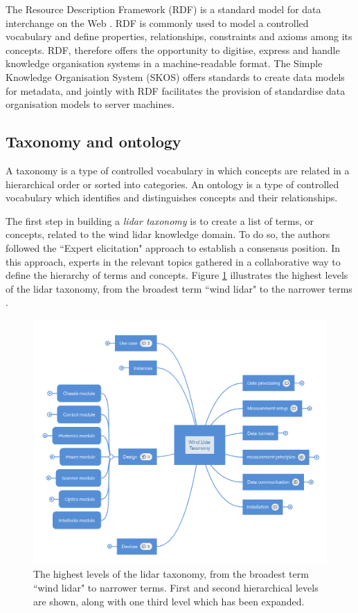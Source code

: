 \documentclass[remotesensing,article,submit,pdftex,moreauthors]{Definitions/mdpi}
\begin{document}
The Resource Description Framework (RDF) is a standard model for data interchange on the Web \cite{ref-W3C-RDF}.
RDF is commonly used to model a controlled vocabulary and define properties, relationships, constraints and axioms among its concepts.
RDF, therefore offers the opportunity to digitise, express and handle knowledge organisation systems in a machine-readable format.
The Simple Knowledge Organisation System (SKOS) \cite{ref-W3C-SKOS} offers standards to create data models for metadata, and jointly with RDF facilitates the provision of standardise data organisation models to server machines.

\subsection{Taxonomy and ontology}
A taxonomy is a type of controlled vocabulary in which concepts are related in a hierarchical order or sorted into categories.
An ontology is a type of controlled vocabulary
which identifies and distinguishes concepts and their relationships.

The first step in building a {\it lidar taxonomy} is to create a list of terms, or concepts, related to the wind lidar knowledge domain. To do so, the authors followed the ``Expert elicitation" approach to establish a consensus position. In this approach, experts in the relevant topics gathered in a collaborative way to define the hierarchy of terms and concepts. Figure \ref{fig:tax} illustrates the highest levels of the lidar taxonomy, from the broadest term ``wind lidar" to the narrower terms \cite{ref-IRPWind}.

\begin{figure}[h]
    \centering
    \includegraphics[width=12cm]{Figures/MindMap.PNG}
    \caption{The highest levels of the lidar taxonomy, from the broadest term ``wind lidar" to narrower terms. First and second hierarchical levels are shown, along with one third level which has been expanded.}
    \label{fig:tax}
\end{figure}
\end{document}
